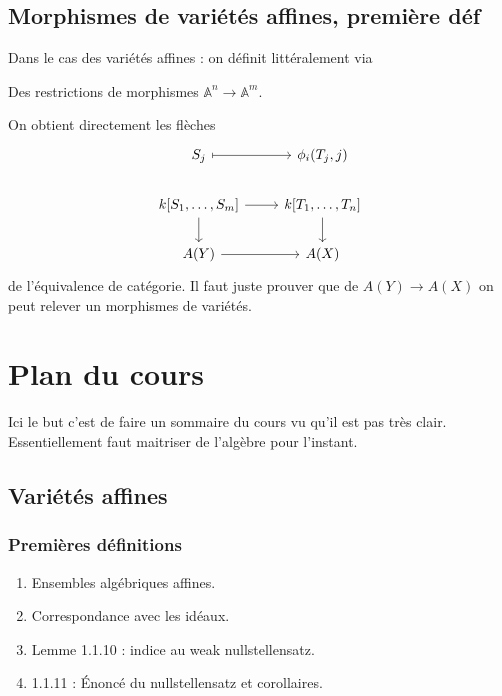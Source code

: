 \documentclass[a4paper,12pt]{book}
\newcommand{\A}{\mathbb{A}}
\theoremstyle{plain}
\theoremstyle{definition}
\theoremstyle{remark}
\begin{document}
\section{Morphismes de variétés affines, première déf}
Dans le cas des variétés affines : on définit littéralement via 
\begin{center}
    Des restrictions de morphismes $\A^n\to \A^m$.
\end{center}
On obtient directement les flèches 
\[\begin{tikzcd}
	{S_j} & {\phi_i(T_j,j)} \\
	{k[S_1,\ldots,S_m]} & {k[T_1,\ldots,T_n]} \\
	{A(Y)} & {A(X)}
	\arrow[maps to, from=1-1, to=1-2]
	\arrow[from=2-1, to=2-2]
	\arrow[from=2-1, to=3-1]
	\arrow[from=2-2, to=3-2]
	\arrow[from=3-1, to=3-2]
\end{tikzcd}\]
de l'équivalence de catégorie. Il faut juste prouver que de 
$A(Y)\to A(X)$ on peut relever un morphismes de variétés.


\chapter{Plan du cours}
Ici le but c'est de faire un sommaire du cours vu qu'il est pas très 
clair. Essentiellement faut maitriser de l'algèbre pour l'instant.


\section{Variétés affines}
\subsection{Premières définitions}

\begin{enumerate}
    \item Ensembles algébriques affines.
    \item Correspondance avec les idéaux.
    \item Lemme 1.1.10 : indice au weak nullstellensatz.
    \item 1.1.11 : Énoncé du nullstellensatz et corollaires.
\end{enumerate}
\end{document}
